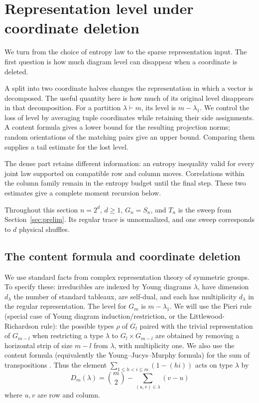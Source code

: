 \section{Representation level under coordinate deletion}\label{tra:projection-deletion}

We turn from the choice of entropy law to the sparse representation input. The first question is how much diagram level can disappear when a coordinate is deleted.

A split into two coordinate halves changes the representation in which a vector is decomposed. The useful quantity here is how much of its original level disappears in that decomposition. For a partition $\lambda\vdash m$, its level is $m-\lambda_1$. We control the loss of level by averaging tuple coordinates while retaining their side assignments. A content formula gives a lower bound for the resulting projection norms; random orientations of the matching pairs give an upper bound. Comparing them supplies a tail estimate for the lost level.

The dense part retains different information: an entropy inequality valid for every joint law supported on compatible row and column moves. Correlations within the column family remain in the entropy budget until the final step. These two estimates give a complete moment recursion below.

Throughout this section $n=2^d$, $d\ge1$, $G_n=S_n$, and $T_n$ is the sweep from Section~\ref{sec:prelim}. Its regular trace is unnormalized, and one sweep corresponds to $d$ physical shuffles.

\subsection{The content formula and coordinate deletion}
\label{tra:projection-deletion:content-and-injection-preliminaries}
We use standard facts from complex representation theory of symmetric groups. To specify these: irreducibles are indexed by Young diagrams \(\lambda\), have dimension \(d_\lambda\) the number of standard tableaux, are self-dual, and each has multiplicity \(d_\lambda\) in the regular representation. The level for \(G_m\) is \(m-\lambda_1\). We will use the Pieri rule (special case of Young diagram induction/restriction, or the Littlewood-Richardson rule): the possible types \(\rho\) of \(G_l\) paired with the trivial representation of \(G_{m-l}\) when restricting a type \(\lambda\) to \(G_l\times G_{m-l}\) are obtained by removing a horizontal strip of size \(m-l\) from \(\lambda\), with multiplicity one. We also use the content formula (equivalently the Young--Jucys--Murphy formula) for the sum of transpositions \cite[Eq.~(2.1), Proposition~5.3, Theorem~5.8]{VershikOkounkov2005}. Thus the element \(\sum_{1\le h<i\le m}(1-(hi))\) acts on type \(\lambda\) by
\begin{equation}
D_m(\lambda)=\binom m2-\sum_{(u,v)\in\lambda}(v-u)
\label{tra:projection-deletion:eq2}
\end{equation}
where \(u,v\) are row and column.

